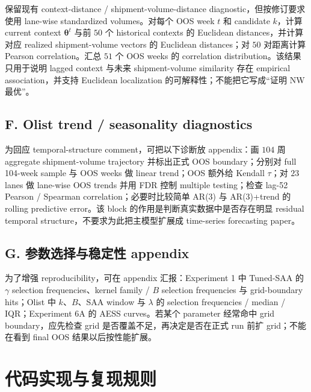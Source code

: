 \documentclass[11pt,a4paper]{ctexart}
\begin{document}
保留现有 context-distance / shipment-volume-distance diagnostic，但按修订要求使用 lane-wise standardized volumes。对每个 OOS week $t$ 和 candidate $k$，计算 current context $\boldsymbol\theta^t$ 与前 $50$ 个 historical contexts 的 Euclidean distances，并计算对应 realized shipment-volume vectors 的 Euclidean distances；对 $50$ 对距离计算 Pearson correlation。汇总 $51$ 个 OOS weeks 的 correlation distribution。该结果只用于说明 lagged context 与未来 shipment-volume similarity 存在 empirical association，并支持 Euclidean localization 的可解释性；不能把它写成“证明 NW 最优”。

\subsection{F. Olist trend / seasonality diagnostics}

为回应 temporal-structure comment，可把以下诊断放 appendix：画 $104$ 周 aggregate shipment-volume trajectory 并标出正式 OOS boundary；分别对 full 104-week sample 与 OOS weeks 做 linear trend；OOS 额外给 Kendall $\tau$；对 $23$ lanes 做 lane-wise OOS trends 并用 FDR 控制 multiple testing；检查 lag-52 Pearson / Spearman correlation；必要时比较简单 AR(3) 与 AR(3)+trend 的 rolling predictive error。该 block 的作用是判断真实数据中是否存在明显 residual temporal structure，不要求为此把主模型扩展成 time-series forecasting paper。

\subsection{G. 参数选择与稳定性 appendix}

为了增强 reproducibility，可在 appendix 汇报：Experiment 1 中 Tuned-SAA 的 $\gamma$ selection frequencies、kernel family / $B$ selection frequencies 与 grid-boundary hits；Olist 中 $k$、$B$、SAA window 与 $\lambda$ 的 selection frequencies / median / IQR；Experiment 6A 的 AESS curves。若某个 parameter 经常命中 grid boundary，应先检查 grid 是否覆盖不足，再决定是否在正式 run 前扩 grid；不能在看到 final OOS 结果以后按性能扩展。

\section{代码实现与复现规则}
\end{document}
